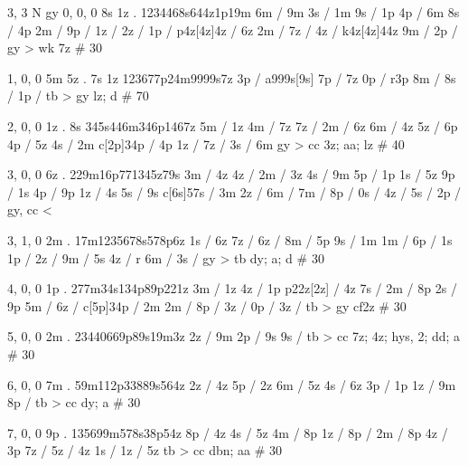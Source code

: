 3, 3
N
gy 
0, 0, 0
8s 1z . 
1234468s644z1p19m
6m / 9m
3s / 1m
9s / 1p 
4p / 6m 
8s / 4p 
2m / 
9p / 
1z / 
2z / 
1p / 
p4z[4z]4z / 6z 
2m / 
7z / 
4z / k4z[4z]44z 
9m / 
2p / 
gy > wk 
7z # 30 

1, 0, 0
5m 5z . 7s 1z
123677p24m9999s7z 
3p / a999s[9s]
7p / 7z 
0p / r3p 
8m / 
8s / 
1p / 
tb > gy 
lz; d # 70 

2, 0, 0
1z . 8s
345s446m346p1467z 
5m / 1z 
4m / 7z 
7z / 
2m / 6z 
6m / 4z 
5z / 6p 
4p / 5z 
4s / 2m 
c[2p]34p / 4p 
1z / 
7z / 
3s / 6m 
gy > cc 
3z; aa; lz # 40

3, 0, 0
6z . 
229m16p771345z79s
3m / 4z 
4z / 
2m / 3z 
4s / 9m 
5p / 1p 
1s / 5z 
9p / 1s 
4p / 9p 
1z / 4s 
5s / 9s 
c[6s]57s / 3m 
2z / 
6m / 
7m / 
8p /
0s / 
4z / 
5s / 
2p / 
gy, cc <

3, 1, 0
2m . 
17m1235678s578p6z 
1s / 6z 
7z / 
6z / 
8m / 5p 
9s / 1m 
1m / 
6p / 1s 
1p / 
2z / 
9m / 5s 
4z / r 
6m /
3s / 
gy > tb 
dy; a; d # 30

4, 0, 0
1p . 
277m34s134p89p221z
3m / 1z 
4z / 1p 
p22z[2z] / 4z 
7s / 
2m / 8p 
2s / 9p 
5m / 
6z / 
c[5p]34p / 2m 
2m / 
8p / 
3z / 
0p / 
3z / 
tb > gy 
cf2z # 30 

5, 0, 0
2m . 
23440669p89s19m3z 
2z / 9m 
2p / 9s 
9s / 
tb > cc 
7z; 4z; hys, 2; dd; a # 30

6, 0, 0
7m . 
59m112p33889s564z 
2z / 4z 
5p / 2z 
6m / 5z 
4s / 6z
3p / 1p 
1z / 9m 
8p / 
tb > cc 
dy; a # 30

7, 0, 0
9p . 
135699m578s38p54z 
8p / 4z 
4s / 5z 
4m / 8p 
1z / 
8p / 
2m / 8p 
4z / 3p 
7z / 
5z / 4z 
1s / 
1z / 5z 
tb > cc 
dbn; aa # 30
